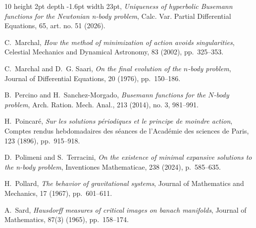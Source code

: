 \documentclass[a4paper,10pt]{amsart}
\theoremstyle{plain}
\theoremstyle{definition}
\numberwithin{equation}{section}
\numberwithin{thm}{section}
\begin{document}
\begin{thebibliography}{10}
\leavevmode\vrule height 2pt depth -1.6pt width 23pt, {\em Uniqueness of
  hyperbolic {B}usemann functions for the {N}ewtonian n-body problem}, Calc. Var. Partial Differential Equations, 65, art. no. 51 (2026).
  
{\sc C.~Marchal}, {\em How the method of minimization of action avoids
  singularities}, Celestial Mechanics and Dynamical Astronomy, 83 (2002),
  pp.~325--353.

{\sc C.~Marchal and D.~G. Saari}, {\em On the final evolution of the $n$-body
  problem}, Journal of Differential Equations, 20 (1976), pp.~150--186.
  
  {\sc B.~Percino and H.~Sanchez-Morgado}, {\em Busemann functions for the $N$-body problem}, Arch. Ration. Mech. Anal., 213 (2014), no. 3, 981--991.

{\sc H.~Poincaré}, {\em Sur les solutions périodiques et le principe de
  moindre action}, Comptes rendus hebdomadaires des séances de l'Académie des
  sciences de Paris, 123 (1896), pp.~915--918.

{\sc D.~Polimeni and S.~Terracini}, {\em On the existence of minimal expansive
  solutions to the n-body problem}, Inventiones Mathematicae, 238 (2024),
  p.~585–635.

{\sc H.~Pollard}, {\em The behavior of gravitational systems}, Journal of
  Mathematics and Mechanics, 17 (1967), pp.~601--611.

{\sc A.~Sard}, {\em Hausdorff measures of critical images on banach manifolds},
  Journal of Mathematics, 87(3) (1965), pp.~158--174.

\end{thebibliography}
\end{document}
